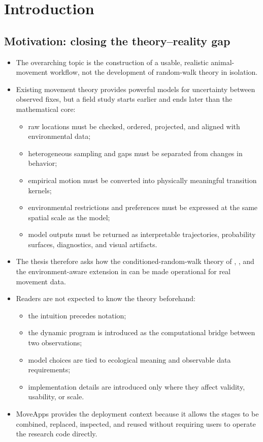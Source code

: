 \chapter{Introduction}
\label{ch:introduction}

\section{Motivation: closing the theory--reality gap}
\label{sec:motivation:-closing-the-theory--reality-gap}



\begin{itemize}
  \item The overarching topic is the construction of a usable, realistic animal-movement workflow, not the development of random-walk theory in isolation.
  \item Existing movement theory provides powerful models for uncertainty between observed fixes, but a field study starts earlier and ends later than the mathematical core:
  \begin{itemize}
    \item raw locations must be checked, ordered, projected, and aligned with environmental data;
    \item heterogeneous sampling and gaps must be separated from changes in behavior;
    \item empirical motion must be converted into physically meaningful transition kernels;
    \item environmental restrictions and preferences must be expressed at the same spatial scale as the model;
    \item model outputs must be returned as interpretable trajectories, probability surfaces, diagnostics, and visual artifacts.
  \end{itemize}
  \item The thesis therefore asks how the conditioned-random-walk theory of \textcite{buchin2024randomwalks}, \textcite{hagedoornPhD}, and the environment-aware extension in \textcite{buchin2026advanced} can be made operational for real movement data.
  \item Readers are not expected to know the theory beforehand:
  \begin{itemize}
    \item the intuition precedes notation;
    \item the dynamic program is introduced as the computational bridge between two observations;
    \item model choices are tied to ecological meaning and observable data requirements;
    \item implementation details are introduced only where they affect validity, usability, or scale.
  \end{itemize}
  \item MoveApps provides the deployment context because it allows the stages to be combined, replaced, inspected, and reused without requiring users to operate the research code directly.
\end{itemize}

